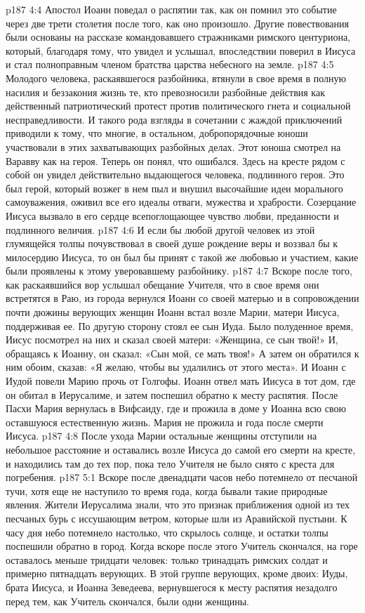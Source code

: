 \vs p187 4:4 Апостол Иоанн поведал о распятии так, как он помнил это событие через две трети столетия после того, как оно произошло. Другие повествования были основаны на рассказе командовавшего стражниками римского центуриона, который, благодаря тому, что увидел и услышал, впоследствии поверил в Иисуса и стал полноправным членом братства царства небесного на земле.
\vs p187 4:5 \pc Молодого человека, раскаявшегося разбойника, втянули в свое время в полную насилия и беззакония жизнь те, кто превозносили разбойные действия как действенный патриотический протест против политического гнета и социальной несправедливости. И такого рода взгляды в сочетании с жаждой приключений приводили к тому, что многие, в остальном, добропорядочные юноши участвовали в этих захватывающих разбойных делах. Этот юноша смотрел на Варавву как на героя. Теперь он понял, что ошибался. Здесь на кресте рядом с собой он увидел действительно выдающегося человека, подлинного героя. Это был герой, который возжег в нем пыл и внушил высочайшие идеи морального самоуважения, оживил все его идеалы отваги, мужества и храбрости. Созерцание Иисуса вызвало в его сердце всепоглощающее чувство любви, преданности и подлинного величия.
\vs p187 4:6 И если бы любой другой человек из этой глумящейся толпы почувствовал в своей душе рождение веры и воззвал бы к милосердию Иисуса, то он был бы принят с такой же любовью и участием, какие были проявлены к этому уверовавшему разбойнику.
\vs p187 4:7 \pc Вскоре после того, как раскаявшийся вор услышал обещание Учителя, что в свое время они встретятся в Раю, из города вернулся Иоанн со своей матерью и в сопровождении почти дюжины верующих женщин Иоанн встал возле Марии, матери Иисуса, поддерживая ее. По другую сторону стоял ее сын Иуда. Было полуденное время, Иисус посмотрел на них и сказал своей матери: «Женщина, се сын твой!» И, обращаясь к Иоанну, он сказал: «Сын мой, се мать твоя!» А затем он обратился к ним обоим, сказав: «Я желаю, чтобы вы удалились от этого места». И Иоанн с Иудой повели Марию прочь от Голгофы. Иоанн отвел мать Иисуса в тот дом, где он обитал в Иерусалиме, и затем поспешил обратно к месту распятия. После Пасхи Мария вернулась в Вифсаиду, где и прожила в доме у Иоанна всю свою оставшуюся естественную жизнь. Мария не прожила и года после смерти Иисуса.
\vs p187 4:8 После ухода Марии остальные женщины отступили на небольшое расстояние и оставались возле Иисуса до самой его смерти на кресте, и находились там до тех пор, пока тело Учителя не было снято с креста для погребения.
\vs p187 5:1 Вскоре после двенадцати часов небо потемнело от песчаной тучи, хотя еще не наступило то время года, когда бывали такие природные явления. Жители Иерусалима знали, что это признак приближения одной из тех песчаных бурь с иссушающим ветром, которые шли из Аравийской пустыни. К часу дня небо потемнело настолько, что скрылось солнце, и остатки толпы поспешили обратно в город. Когда вскоре после этого Учитель скончался, на горе оставалось меньше тридцати человек: только тринадцать римских солдат и примерно пятнадцать верующих. В этой группе верующих, кроме двоих: Иуды, брата Иисуса, и Иоанна Зеведеева, вернувшегося к месту распятия незадолго перед тем, как Учитель скончался, были одни женщины.
